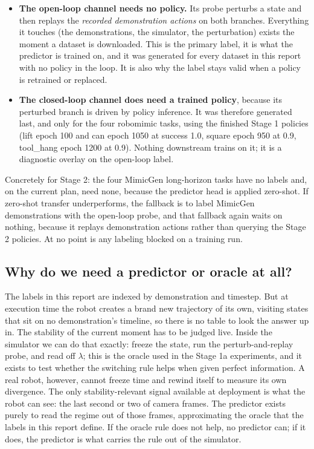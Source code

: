 \documentclass[11pt]{article}
\begin{document}
\begin{itemize}[leftmargin=2em]
  \item \textbf{The open-loop channel needs no policy.} Its probe perturbs a
        state and then replays the \emph{recorded demonstration actions} on
        both branches. Everything it touches (the demonstrations, the
        simulator, the perturbation) exists the moment a dataset is
        downloaded. This is the primary label, it is what the predictor is
        trained on, and it was generated for every dataset in this report
        with no policy in the loop. It is also why the label stays valid
        when a policy is retrained or replaced.
  \item \textbf{The closed-loop channel does need a trained policy}, because
        its perturbed branch is driven by policy inference. It was therefore
        generated last, and only for the four robomimic tasks, using the
        finished Stage 1 policies (lift epoch 100 and can epoch 1050 at
        success 1.0, square epoch 950 at 0.9, tool\_hang epoch 1200 at 0.9).
        Nothing downstream trains on it; it is a diagnostic overlay on the
        open-loop label.
\end{itemize}

Concretely for Stage 2: the four MimicGen long-horizon tasks have no labels
and, on the current plan, need none, because the predictor head is applied
zero-shot. If zero-shot transfer underperforms, the fallback is to label
MimicGen demonstrations with the open-loop probe, and that fallback again
waits on nothing, because it replays demonstration actions rather than
querying the Stage 2 policies. At no point is any labeling blocked on a
training run.

\subsection{Why do we need a predictor or oracle at all?}

The labels in this report are indexed by demonstration and timestep. But at
execution time the robot creates a brand new trajectory of its own, visiting states
that sit on no demonstration's timeline, so there is no table to look the answer up
in. The stability of the current moment has to be judged live. Inside the simulator
we can do that exactly: freeze the state, run the perturb-and-replay probe, and read
off $\lambda$; this is the oracle used in the Stage 1a experiments, and it exists to
test whether the switching rule helps when given perfect information. A real robot,
however, cannot freeze time and rewind itself to measure its own divergence. The
only stability-relevant signal available at deployment is what the robot can see:
the last second or two of camera frames. The predictor exists purely to read the
regime out of those frames, approximating the oracle that the labels in this report
define. If the oracle rule does not help, no predictor can; if it does, the
predictor is what carries the rule out of the simulator.
\end{document}
